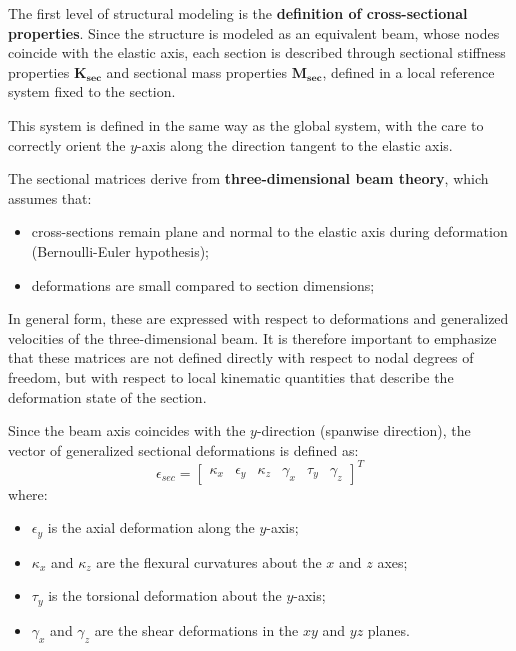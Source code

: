 The first level of structural modeling is the \textbf{definition of cross-sectional properties}. Since the structure is modeled as an equivalent beam, whose nodes
coincide with the elastic axis, each section is described through sectional stiffness properties $\mathbf{K_{sec}}$ and sectional mass properties $\mathbf{M_{sec}}$, defined
in a local reference system fixed to the section.

This system is defined in the same way as the global system, with the care to correctly orient the $y$-axis along the direction tangent to the elastic axis.

The sectional matrices derive from \textbf{three-dimensional beam theory}, which assumes that:
\begin{itemize}
    \item cross-sections remain plane and normal to the elastic axis during deformation (Bernoulli-Euler hypothesis);
    \item deformations are small compared to section dimensions;
\end{itemize}

In general form, these are expressed with respect to deformations and generalized velocities of the three-dimensional beam. It is therefore important to emphasize that these matrices
are not defined directly with respect to nodal degrees of freedom, but with respect to local kinematic quantities that describe the deformation state of the section.

Since the beam axis coincides with the $y$-direction (spanwise direction), the vector of generalized sectional deformations is defined as:
\begin{equation}
    \epsilon_{sec} =
    \begin{bmatrix}
        \kappa_{x} & \epsilon_{y} & \kappa_{z} & \gamma_{x} & \tau_{y} & \gamma_{z}
    \end{bmatrix}^T
    \label{eq:sectional_strains}
\end{equation}
where:
\begin{itemize}
    \item $\epsilon_{y}$ is the axial deformation along the $y$-axis;
    \item $\kappa_{x}$ and $\kappa_{z}$ are the flexural curvatures about the $x$ and $z$ axes;
    \item $\tau_{y}$ is the torsional deformation about the $y$-axis;
    \item $\gamma_{x}$ and $\gamma_{z}$ are the shear deformations in the $xy$ and $yz$ planes.
\end{itemize}

